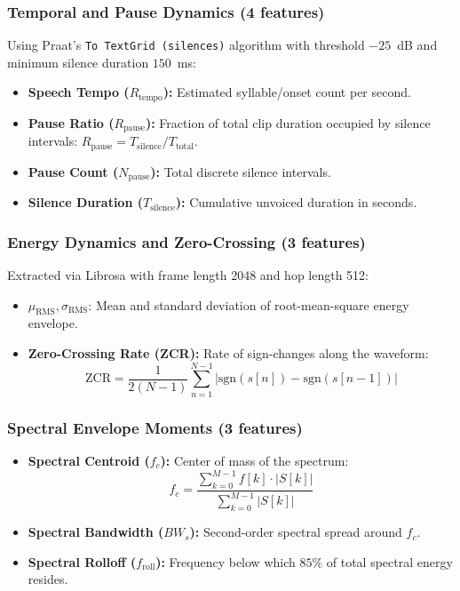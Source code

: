 \documentclass[conference]{IEEEtran}
\begin{document}
\subsubsection{Temporal and Pause Dynamics (4 features)}
Using Praat's \texttt{To TextGrid (silences)} algorithm with threshold $-25$~dB and minimum silence duration $150$~ms:
\begin{itemize}
    \item \textbf{Speech Tempo ($R_{\text{tempo}}$):} Estimated syllable/onset count per second.
    \item \textbf{Pause Ratio ($R_{\text{pause}}$):} Fraction of total clip duration occupied by silence intervals: $R_{\text{pause}} = T_{\text{silence}} / T_{\text{total}}$.
    \item \textbf{Pause Count ($N_{\text{pause}}$):} Total discrete silence intervals.
    \item \textbf{Silence Duration ($T_{\text{silence}}$):} Cumulative unvoiced duration in seconds.
\end{itemize}

\subsubsection{Energy Dynamics and Zero-Crossing (3 features)}
Extracted via Librosa with frame length 2048 and hop length 512:
\begin{itemize}
    \item $\mu_{\text{RMS}}, \sigma_{\text{RMS}}$: Mean and standard deviation of root-mean-square energy envelope.
    \item \textbf{Zero-Crossing Rate (ZCR):} Rate of sign-changes along the waveform:
    \begin{equation}
        \text{ZCR} = \frac{1}{2(N-1)}\sum_{n=1}^{N-1} |\text{sgn}(s[n]) - \text{sgn}(s[n-1])|
    \end{equation}
\end{itemize}

\subsubsection{Spectral Envelope Moments (3 features)}
\begin{itemize}
    \item \textbf{Spectral Centroid ($f_c$):} Center of mass of the spectrum:
    \begin{equation}
        f_c = \frac{\sum_{k=0}^{M-1} f[k] \cdot |S[k]|}{\sum_{k=0}^{M-1} |S[k]|}
    \end{equation}
    \item \textbf{Spectral Bandwidth ($BW_s$):} Second-order spectral spread around $f_c$.
    \item \textbf{Spectral Rolloff ($f_{\text{roll}}$):} Frequency below which $85\%$ of total spectral energy resides.
\end{itemize}
\end{document}
